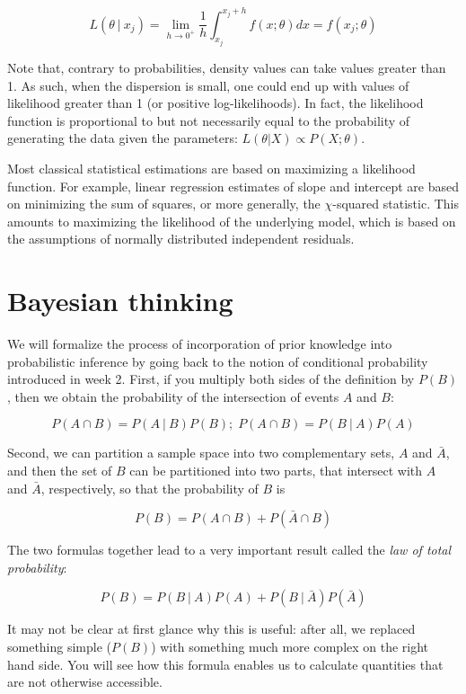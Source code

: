 \documentclass[
  letterpaper,
  DIV=11,
  numbers=noendperiod]{scrreprt}
\begin{document}
\[
L(\theta \ \vert \ x_j) = \lim_{h \to 0^+} \frac{1}{h} \int_{x_j}^{x_j + h} f(x ; \theta) dx = f(x_j ; \theta)
\]

Note that, contrary to probabilities, density values can take values
greater than 1. As such, when the dispersion is small, one could end up
with values of likelihood greater than 1 (or positive log-likelihoods).
In fact, the likelihood function is proportional to but not necessarily
equal to the probability of generating the data given the parameters:
\(L(\theta\vert X) \propto P(X; \theta)\).

Most classical statistical estimations are based on maximizing a
likelihood function. For example, linear regression estimates of slope
and intercept are based on minimizing the sum of squares, or more
generally, the \(\chi\)-squared statistic. This amounts to maximizing
the likelihood of the underlying model, which is based on the
assumptions of normally distributed independent residuals.

\hypertarget{bayesian-thinking}{%
\section{Bayesian thinking}\label{bayesian-thinking}}

We will formalize the process of incorporation of prior knowledge into
probabilistic inference by going back to the notion of conditional
probability introduced in week 2. First, if you multiply both sides of
the definition by \(P(B)\), then we obtain the probability of the
intersection of events \(A\) and \(B\):

\[P(A \cap B) = P(A \ \vert \ B) P(B); \;  P(A \cap B) = P(B \ \vert \ A) P(A) \]

Second, we can partition a sample space into two complementary sets,
\(A\) and \(\bar A\), and then the set of \(B\) can be partitioned into
two parts, that intersect with \(A\) and \(\bar A\), respectively, so
that the probability of \(B\) is

\[P(B) = P(A \cap B) + P( \bar A\cap B)\]

The two formulas together lead to a very important result called the
\emph{law of total probability}:

\[
P(B) =  P(B \ \vert \ A) P(A) + P(B \ \vert \ \bar A)P(\bar A)
\]

It may not be clear at first glance why this is useful: after all, we
replaced something simple (\(P(B)\)) with something much more complex on
the right hand side. You will see how this formula enables us to
calculate quantities that are not otherwise accessible.
\end{document}
